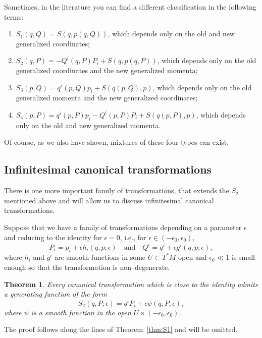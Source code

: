 \documentclass[english,fontsize=11pt,paper=a5,oneside]{scrbook}
\newtheorem{theorem}{Theorem}[chapter]
\theoremstyle{definition}
\newenvironment{remark}
  {\pushQED{\qed}\renewcommand{\qedsymbol}{$\lozenge$}\remarkx}
  {\popQED\endremarkx}
\begin{document}
\begin{remark}
  Sometimes, in the literature you can find a different classification in the following terms:
  \begin{enumerate}
    \item $S_1(q,Q) = S(q,p(q,Q))$, which depends only on the old and new generalized coordinates;
    \item $S_2(q,P) = - Q^i(q,P) P_i + S(q,p(q,P))$, which depends only on the old generalized coordinates and the new generalized momenta;
    \item $S_3(p,Q) = q^i(p,Q) p_i + S(q(p,Q),p)$, which depends only on the old generalized momenta and the new generalized coordinates;
    \item $S_4(p,P) = q^i(p,P) p_i - Q^i(p,P) P_i + S(q(p,P),p)$, which depends only on the old and new generalized momenta.
  \end{enumerate}
  Of course, as we also have shown, mixtures of these four types can exist.
\end{remark}

\subsection{Infinitesimal canonical transformations}

There is one more important family of transformations, that extends the $S_2$ mentioned above and will allow us to discuss infinitesimal canonical transformations.

Suppose that we have a family of transformations depending on a parameter $\epsilon$ and reducing to the identity for $\epsilon = 0$, i.e., for $\epsilon \in (-\epsilon_0, \epsilon_0)$,
\begin{equation}\label{eq:infcantraf}
  P_i = p_i + \epsilon h_i(q,p;\epsilon) \quad\mbox{and}\quad
  Q^i = q^i + \epsilon g^i(q,p; \epsilon),
\end{equation}
where $h_i$ and $g^i$ are smooth functions in some $U\subset T^*M$ open and $\epsilon_0 \ll 1$ is small enough so that the transformation is non--degenerate.

\begin{theorem}
  Every canonical transformation which is close to the identity admits a generating function of the form
  \begin{equation}\label{eq:infS2}
    S_2(q, P; \epsilon) = q^i P_i + \epsilon \psi(q,P,\epsilon),
  \end{equation}
  where $\psi$ is a smooth function in the open $U\times(-\epsilon_0,\epsilon_0)$.
\end{theorem}
The proof follows along the lines of Theorem~\ref{thm:S1} and will be omitted.
\end{document}
